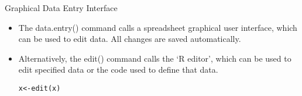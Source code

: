 \begin{slide}{Graphical Data Entry Interface}
\begin{itemize}

\item The data.entry() command calls a spreadsheet graphical user
interface, which can be used to edit data. All changes are saved
automatically.




\item Alternatively, the edit() command calls the `R editor',
which can be used to edit specified data or the code used to
define that data.

\begin{verbatim}
x<-edit(x)
\end{verbatim}

\end{itemize}
\end{slide}

